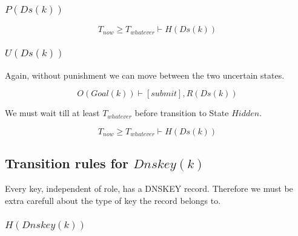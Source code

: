 \documentclass[twoside, a4paper]{article}
\newcommand{\highlightMinSig}[1]{\textcolor{MinSig}{\bf{#1}}}
\newcommand{\mathbox}[1]{#1}
\begin{document}
\subsubsection{$P(Ds(k))$}
\highlightMinSig{
\begin{equation}
		T_{now} \geq T_{whatever} \vdash H(Ds(k))
\end{equation}
}

\subsubsection{$U(Ds(k))$}

\mathbox{

	Again, without punishment we can move between the two uncertain 
	states.

	\begin{equation}
			O(Goal(k)) \vdash [submit], R(Ds(k)) 
	\end{equation}

	We must wait till at least $T_{whatever}$ before transition to State 
	$Hidden$.
	
	\begin{equation}
			T_{now} \geq T_{whatever} \vdash H(Ds(k))
	\end{equation}
}


\subsection{Transition rules for $Dnskey(k)$}

Every key, independent of role, has a DNSKEY record. Therefore we must
be extra carefull about the type of key the record belongs to.

\subsubsection{$H(Dnskey(k))$}
\end{document}

